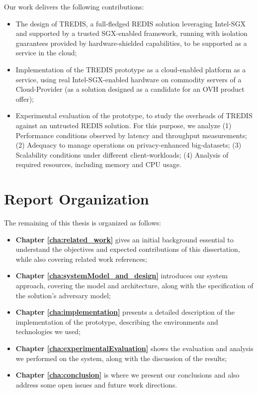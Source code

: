 Our work delivers the following contributions:
\begin{itemize}
	\item The design of TREDIS, a full-fledged REDIS solution leveraging Intel-SGX and supported by a trusted SGX-enabled framework, running with isolation guarantees provided by hardware-shielded capabilities, to be supported as a service in the cloud;
	\item Implementation of the TREDIS prototype as a cloud-enabled platform as a service, using real Intel-SGX-enabled hardware on commodity servers of a Cloud-Provider (as a solution designed as a candidate for an OVH product offer);
	\item Experimental evaluation of the prototype, to study the overheads of TREDIS against an untrusted REDIS solution. For this purpose, we analyze (1) Performance conditions observed by latency and throughput measurements; (2) Adequacy to manage operations on privacy-enhanced big-datasets; (3) Scalability conditions under different client-workloads; (4) Analysis of required resources, including memory and CPU usage.
	
\end{itemize}




\section{Report Organization}

The remaining of this thesis is organized as follows:
\begin{itemize}
	\item \textbf{Chapter \ref{cha:related_work}} gives an initial background essential to understand the objectives and expected contributions of this dissertation, while also covering related work references; 
	
	\item \textbf{Chapter \ref{cha:systemModel_and_design}} introduces our system approach, covering the model and architecture, along with the specification of the solution's adversary model;

	\item \textbf{Chapter \ref{cha:implementation}} presents a detailed description of the implementation of the prototype, describing the environments and technologies we used;
	
	\item \textbf{Chapter \ref{cha:experimentalEvaluation}} shows the evaluation and analysis we performed on the system, along with the discussion of the results;
	
	\item \textbf{Chapter \ref{cha:conclusion}} is where we present our conclusions and also address some open issues and future work directions.
	
\end{itemize}
